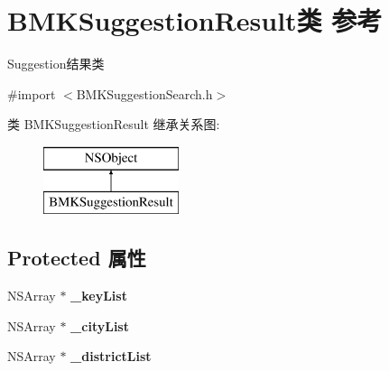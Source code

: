 \hypertarget{interface_b_m_k_suggestion_result}{\section{B\+M\+K\+Suggestion\+Result类 参考}
\label{interface_b_m_k_suggestion_result}
}


Suggestion结果类  




{\ttfamily \#import $<$B\+M\+K\+Suggestion\+Search.\+h$>$}

类 B\+M\+K\+Suggestion\+Result 继承关系图\+:\begin{figure}[H]
\begin{center}
\leavevmode
\includegraphics[height=2.000000cm]{interface_b_m_k_suggestion_result}
\end{center}
\end{figure}
\subsection*{Protected 属性}
\begin{DoxyCompactItemize}
\item 
\hypertarget{interface_b_m_k_suggestion_result_af33171b4e254408d71e6e6904ff361a1}{N\+S\+Array $\ast$ {\bfseries \+\_\+key\+List}}\label{interface_b_m_k_suggestion_result_af33171b4e254408d71e6e6904ff361a1}

\item 
\hypertarget{interface_b_m_k_suggestion_result_a6b3b6f1702dbb6acbe1d77e71d5b07b5}{N\+S\+Array $\ast$ {\bfseries \+\_\+city\+List}}\label{interface_b_m_k_suggestion_result_a6b3b6f1702dbb6acbe1d77e71d5b07b5}

\item 
\hypertarget{interface_b_m_k_suggestion_result_a0d6c54df02825f8166ff6c55c95b8770}{N\+S\+Array $\ast$ {\bfseries \+\_\+district\+List}}\label{interface_b_m_k_suggestion_result_a0d6c54df02825f8166ff6c55c95b8770}

\end{DoxyCompactItemize}
